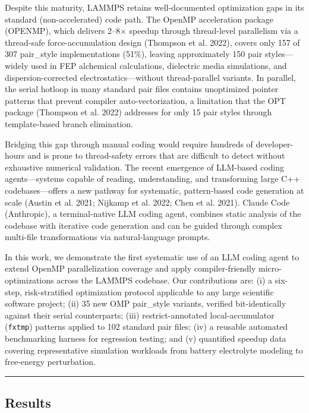 \documentclass[
  11pt,
]{article}
\begin{document}
Despite this maturity, LAMMPS retains well-documented optimization gaps
in its standard (non-accelerated) code path. The OpenMP acceleration
package (OPENMP), which delivers 2--8\(\times\) speedup through
thread-level parallelism via a thread-safe force-accumulation design
({Thompson et al.} 2022), covers only 157 of 307 pair\_style
implementations (51\%), leaving approximately 150 pair styles---widely
used in FEP alchemical calculations, dielectric media simulations, and
dispersion-corrected electrostatics---without thread-parallel variants.
In parallel, the serial hotloop in many standard pair files contains
unoptimized pointer patterns that prevent compiler auto-vectorization, a
limitation that the OPT package ({Thompson et al.} 2022) addresses for
only 15 pair styles through template-based branch elimination.

Bridging this gap through manual coding would require hundreds of
developer-hours and is prone to thread-safety errors that are difficult
to detect without exhaustive numerical validation. The recent emergence
of LLM-based coding agents---systems capable of reading, understanding,
and transforming large C++ codebases---offers a new pathway for
systematic, pattern-based code generation at scale ({Austin et al.}
2021; {Nijkamp et al.} 2022; {Chen et al.} 2021). Claude Code
(Anthropic), a terminal-native LLM coding agent, combines static
analysis of the codebase with iterative code generation and can be
guided through complex multi-file transformations via natural-language
prompts.

In this work, we demonstrate the first systematic use of an LLM coding
agent to extend OpenMP parallelization coverage and apply
compiler-friendly micro-optimizations across the LAMMPS codebase. Our
contributions are: (i) a six-step, risk-stratified optimization protocol
applicable to any large scientific software project; (ii) 35 new OMP
pair\_style variants, verified bit-identically against their serial
counterparts; (iii) restrict-annotated local-accumulator
(\texttt{fxtmp}) patterns applied to 102 standard pair files; (iv) a
reusable automated benchmarking harness for regression testing; and (v)
quantified speedup data covering representative simulation workloads
from battery electrolyte modeling to free-energy perturbation.

\begin{center}\rule{0.5\linewidth}{0.5pt}\end{center}

\subsection{Results}\label{results}
\end{document}
